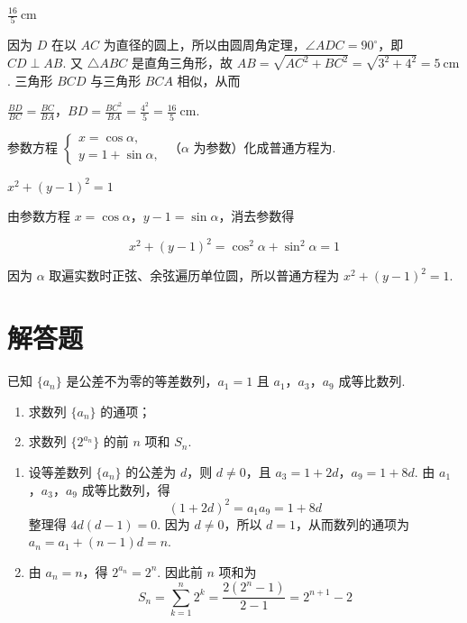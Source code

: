 \begin{answer}
\(\frac{16}{5}\mathrm{~cm}\)
\end{answer}

\begin{solution}
因为 \(D\) 在以 \(AC\) 为直径的圆上，所以由圆周角定理，\(\angle ADC=90^{\circ}\)，即 \(CD\perp AB\). 又 \(\triangle ABC\) 是直角三角形，故 \(AB=\sqrt{AC^2+BC^2}=\sqrt{3^2+4^2}=5\mathrm{~cm}\). 三角形 \(BCD\) 与三角形 \(BCA\) 相似，从而

\(\frac{BD}{BC}=\frac{BC}{BA}\)，\(BD=\frac{BC^2}{BA}=\frac{4^2}{5}=\frac{16}{5}\mathrm{~cm}\).
\end{solution}

\reuseproblemnumber
\begin{problem}[C]
参数方程 \(\begin{cases}
x = \cos \alpha,\\
y = 1 + \sin \alpha,
\end{cases}\) （\(\alpha\) 为参数）化成普通方程为\fillinblank{}.
\end{problem}

\begin{answer}
\(x^2 + (y - 1)^2 = 1\)
\end{answer}

\begin{solution}
由参数方程 \(x=\cos\alpha\)，\(y-1=\sin\alpha\)，消去参数得

\[
x^2+(y-1)^2=\cos^2\alpha+\sin^2\alpha=1
\]

因为 \(\alpha\) 取遍实数时正弦、余弦遍历单位圆，所以普通方程为 \(x^2+(y-1)^2=1\).
\end{solution}

\section{解答题}

\begin{problem}
已知 \( \{a_{n}\} \) 是公差不为零的等差数列，\( a_{1}=1 \) 且 \(a_{1}\)，\(a_{3}\)，\(a_{9}\) 成等比数列.

\begin{enumerate}
\item 求数列 \( \{a_{n}\} \) 的通项；
\item 求数列 \( \{2^{a_{n}}\} \) 的前 \(n\) 项和 \( S_{n} \).
\end{enumerate}
\end{problem}

\begin{solution}
\begin{enumerate}
\item 设等差数列 \(\{a_n\}\) 的公差为 \(d\)，则 \(d\neq 0\)，且 \(a_3=1+2d\)，\(a_9=1+8d\). 由 \(a_1\)，\(a_3\)，\(a_9\) 成等比数列，得
\[
(1+2d)^2=a_1a_9=1+8d
\]
整理得 \(4d(d-1)=0\). 因为 \(d\neq 0\)，所以 \(d=1\)，从而数列的通项为 \(a_n=a_1+(n-1)d=n\).
\item 由 \(a_n=n\)，得 \(2^{a_n}=2^n\). 因此前 \(n\) 项和为
\[
S_n=\sum_{k=1}^{n}2^k=\frac{2(2^n-1)}{2-1}=2^{n+1}-2
\]
\end{enumerate}
\end{solution}


